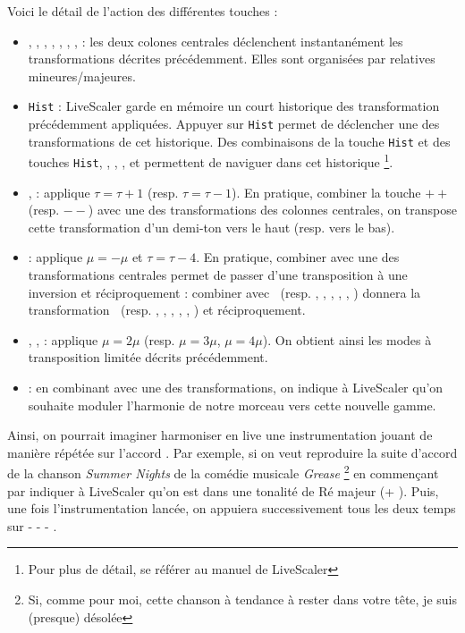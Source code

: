Voici le détail de l'action des différentes touches : 
\begin{itemize}
  \item \LSI, \LSvi, \LSIV, \LSII, \LSV, \LSiii, \LSII, \LSvii :  les deux colones centrales déclenchent instantanément les transformations décrites précédemment. Elles sont organisées par relatives mineures/majeures.
  \item  \texttt{Hist} : LiveScaler garde en mémoire un court historique des transformation précédemment appliquées. Appuyer sur \texttt{Hist} permet de déclencher une des transformations de cet historique. Des combinaisons de la touche \texttt{Hist} et des touches \texttt{Hist}, \LSMm, \LStwo, \LSthree, et \LSfour permettent de naviguer dans cet historique \footnote{Pour plus de détail, se référer au manuel de LiveScaler}. 
  \item \LSpp, \LSmm : applique  $\tau = \tau + 1$ (resp. $\tau = \tau - 1$). En pratique, combiner la touche $++$ (resp. $--$) avec une des transformations des colonnes centrales, on transpose cette transformation d'un demi-ton vers le haut (resp. vers le bas). 
  \item  \LSMm : applique $\mu = -\mu$ et $\tau = \tau - 4$.  En pratique, combiner \LSMm avec une des transformations centrales permet de passer d'une transposition à une inversion et réciproquement : combiner \LSMm avec \LSI $~$ (resp. \LSii, \LSiii, \LSIV, \LSV, \LSvi, \LSvii) donnera la transformation \LSi $~$ (resp.  \LSII, \LSIII, \LSiv, \LSv, \LSVI, \LSVII) et réciproquement. 
  \item \LStwo, \LSthree, \LSfour : applique $\mu = 2\mu$ (resp. $\mu = 3\mu$, $\mu = 4\mu$). On obtient ainsi les modes à transposition limitée décrits précédemment.
  \item \LSMod : en combinant \LSMod avec une des transformations, on indique à LiveScaler qu'on souhaite moduler l'harmonie de notre morceau vers cette nouvelle gamme. 
\end{itemize}

Ainsi, on pourrait imaginer harmoniser en live une instrumentation jouant de manière répétée sur l'accord . Par exemple, si on veut reproduire la suite d'accord de la chanson \emph{Summer Nights} de la comédie musicale \emph{Grease} \footnote{Si, comme pour moi, cette chanson à tendance à rester dans votre tête, je suis (presque) désolée} en commençant par indiquer à LiveScaler qu'on est dans une tonalité de Ré majeur (\LSMod + \LSII). Puis, une fois l'instrumentation lancée, on appuiera successivement tous les deux temps sur  \LSI - \LSIV - \LSV - \LSIV.

